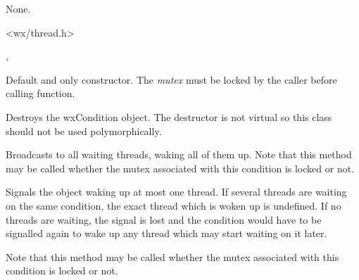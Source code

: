 
None.


<wx/thread.h>


, 


\label{wxconditionconstr}


Default and only constructor. The {\it mutex} must be locked by the caller
before calling  function.



Destroys the wxCondition object. The destructor is not virtual so this class
should not be used polymorphically.

\label{wxconditionbroadcast}


Broadcasts to all waiting threads, waking all of them up. Note that this method
may be called whether the mutex associated with this condition is locked or
not.



\label{wxconditionsignal}


Signals the object waking up at most one thread. If several threads are waiting
on the same condition, the exact thread which is woken up is undefined. If no
threads are waiting, the signal is lost and the condition would have to be
signalled again to wake up any thread which may start waiting on it later.

Note that this method may be called whether the mutex associated with this
condition is locked or not.



\label{wxconditionwait}

